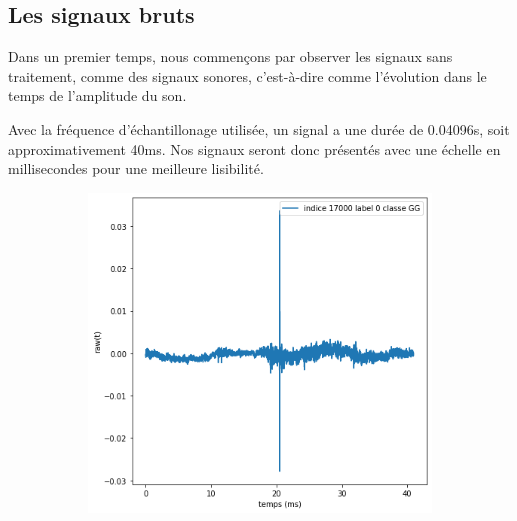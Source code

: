 \hypertarget{Signaux-Bruts}{%
\subsection{Les signaux bruts}
\label{Signaux-Bruts}}

Dans un premier temps, nous commençons par observer les signaux sans traitement, comme des signaux sonores, c'est-à-dire comme l'évolution dans le temps de l'amplitude du son.

Avec la fréquence d'échantillonage utilisée, un signal a une durée de 0.04096s,
soit approximativement 40ms.
Nos signaux seront donc présentés avec une échelle en millisecondes pour une
meilleure lisibilité.

\begin{figure}[!h]
\centering
	\begin{subfigure}[b]{0.3\textwidth}
    \includegraphics[width=\textwidth]{./images/indice17000Spectro1Dlabel0classeGGsansprocessingsanszoom.png}
    \caption{}
  	\end{subfigure}
  	\begin{subfigure}[b]{0.3\textwidth}

\end{subfigure}
\end{figure}
